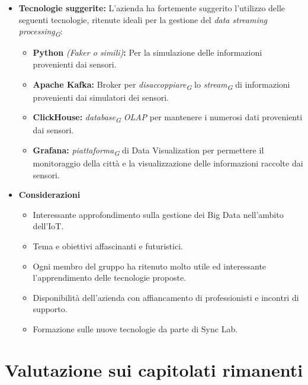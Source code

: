 \documentclass{article}
\begin{document}
\begin{itemize}
    \item[] \textbf{Tecnologie suggerite:} L’azienda ha fortemente suggerito l’utilizzo delle seguenti tecnologie, ritenute ideali per la gestione del \textit{data streaming processing}\textsubscript{\textit{G}}: 
    \begin{itemize}
        \item \textbf{Python} \textit{(Faker o simili)}\textbf{:} Per la simulazione delle informazioni provenienti dai sensori.  
        \item \textbf{Apache Kafka:} Broker per \textit{disaccoppiare}\textsubscript{\textit{G}} lo \textit{stream}\textsubscript{\textit{G}} di informazioni provenienti dai simulatori dei sensori. 
        \item \textbf{ClickHouse:} \textit{database}\textsubscript{\textit{G}} \textit{OLAP} per mantenere i numerosi dati provenienti dai sensori. 
        \item \textbf{Grafana:} \textit{piattaforma}\textsubscript{\textit{G}} di Data Visualization per permettere il monitoraggio della città e la visualizzazione delle informazioni raccolte dai sensori. 
    \end{itemize}
    
    \item[] \textbf{Considerazioni}
    \vspace{-0.2cm}
    \begin{itemize}
        \item Interessante approfondimento sulla gestione dei Big Data nell’ambito dell’IoT. 
        \item Tema e obiettivi affascinanti e futuristici. 
        \item Ogni membro del gruppo ha ritenuto molto utile ed interessante l’apprendimento delle tecnologie proposte. 
        \item Disponibilità dell’azienda con affiancamento di professionisti e incontri di supporto. 
        \item Formazione sulle nuove tecnologie da parte di Sync Lab. 
    \end{itemize} 

\end{itemize}
    
\vspace{2cm}

\section{Valutazione sui capitolati rimanenti}
\end{document}
